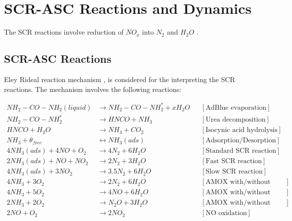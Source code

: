 \section{SCR-ASC Reactions and Dynamics}
The SCR reactions involve reduction of $NO_x$ into $N_2$ and $H_2 O$ \cite{jain2023diagnostics}.

\subsection{SCR-ASC Reactions}
Eley Rideal reaction mechanism \cite{hsieh2011development}
\cite{yuan2015diesel}, \cite{nova2014urea} is considered for the interpreting
the SCR reactions. The mechanism involves the following reactions:

\begin{align}
    NH_2 - CO - NH_2 (liquid) &\longrightarrow NH_2 - CO - NH_2^* + x H_2 O
                & &[\text{AdBlue evaporation}] \label{eqn::urea_1} \\
    NH_2 - CO - NH_2^*  &\longrightarrow  HNCO + NH_3
                & &[\text{Urea decomposition}] \label{eqn::urea_2}\\
    HNCO + H_2O &\longrightarrow NH_3 + CO_2
                & &[\text{Isocynic acid hydrolysis}] \label{eqn::urea_3}\\
    NH_3 + \theta_{free} &\longleftrightarrow NH_3(ads)
                & &[\text{Adsorption/Desorption}] \label{eqn::ads}\\
    4 NH_3 (ads) + 4 NO + O_2 &\longrightarrow 4 N_2 + 6 H_2O
                              & &[\text{Standard SCR reaction}]
                              \label{eqn::std_scr}\\
    2 NH_3 (ads) +  NO + N O_2 &\longrightarrow 2 N_2 + 3 H_2O
                              & &[\text{Fast SCR reaction}]
                              \label{eqn::fast_scr}\\
    4 NH_3 (ads) + 3N O_2 &\longrightarrow 3.5 N_2 + 6 H_2O
                              & &[\text{Slow SCR reaction}]
                              \label{eqn::slow_scr}\\
    4 NH_3 + 3 O_2 &\longrightarrow 2 N_2 + 6 H_2O
                         & &[\text{AMOX with/without ASC}]
                         \label{eqn::amox_N2}\\
    4 NH_3 + 5 O_2 &\longrightarrow 4 NO + 6 H_2 O
                         & &[\text{AMOX with/without ASC}]
                         \label{eqn::amox_NO}\\
    2 NH_3 + 2 O_2 &\longrightarrow N_2O + 3 H_2O
                         & &[\text{AMOX with/without ASC}]
                         \label{eqn::amox_N20}\\
    2 NO + O_2 &\longrightarrow 2 NO_2
                        & &[\text{NO oxidation}]
                        \label{eqn::NOX}
\end{align}



